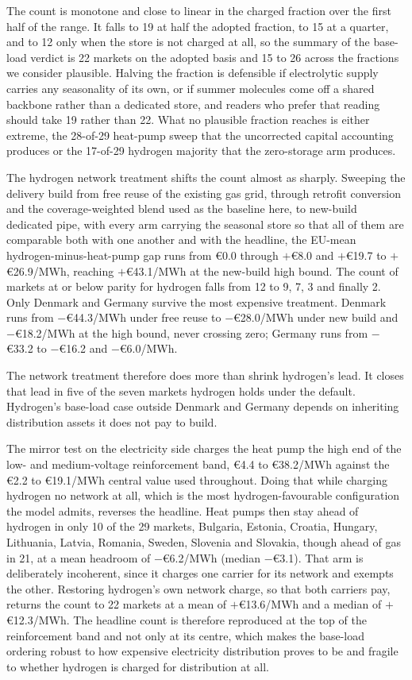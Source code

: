 The count is monotone and close to linear in the charged fraction over the first half
of the range. It falls to 19 at half the adopted fraction, to 15 at a quarter, and to
12 only when the store is not charged at all, so the summary of the base-load
verdict is 22 markets on the adopted basis and 15 to 26 across the fractions we
consider plausible. Halving the fraction is defensible if electrolytic supply carries
any seasonality of its own, or if summer molecules come off a shared backbone rather
than a dedicated store, and readers who prefer that reading should take 19 rather than
22. What no plausible fraction reaches is either extreme, the 28-of-29 heat-pump sweep
that the uncorrected capital accounting produces or the 17-of-29 hydrogen majority that
the zero-storage arm produces.

The hydrogen network treatment shifts the count almost as sharply. Sweeping the
delivery build from free reuse of the existing gas grid, through retrofit conversion
and the coverage-weighted blend used as the baseline here, to new-build dedicated
pipe, with every arm carrying the seasonal store so that all of them are comparable
both with one another and with the headline, the EU-mean hydrogen-minus-heat-pump gap
runs from \euro{}0.0 through $+$\euro{}8.0 and $+$\euro{}19.7 to $+$\euro{}26.9/MWh,
reaching $+$\euro{}43.1/MWh at the new-build high bound. The count of markets at or
below parity for hydrogen falls from 12 to 9, 7, 3 and finally 2. Only Denmark and
Germany survive the most expensive treatment. Denmark runs from $-$\euro{}44.3/MWh
under free reuse to $-$\euro{}28.0/MWh under new build and $-$\euro{}18.2/MWh at the
high bound, never crossing zero; Germany runs from $-$\euro{}33.2 to $-$\euro{}16.2
and $-$\euro{}6.0/MWh.

The network treatment therefore does more than shrink hydrogen's lead. It closes that lead in five of the seven markets hydrogen holds under the default.
Hydrogen's base-load case outside Denmark and Germany depends on inheriting
distribution assets it does not pay to build.

The mirror test on the electricity side charges the heat pump the high end of the
low- and medium-voltage reinforcement band, \euro{}4.4 to \euro{}38.2/MWh against the
\euro{}2.2 to \euro{}19.1/MWh central value used throughout. Doing that while charging
hydrogen no network at all, which is the most hydrogen-favourable configuration the
model admits, reverses the headline. Heat pumps then stay ahead of hydrogen in only 10
of the 29 markets, Bulgaria, Estonia, Croatia, Hungary, Lithuania, Latvia, Romania, Sweden,
Slovenia and Slovakia, though ahead of gas in 21, at a mean headroom of
$-$\euro{}6.2/MWh (median $-$\euro{}3.1). That arm is deliberately incoherent, since it
charges one carrier for its network and exempts the other. Restoring hydrogen's own
network charge, so that both carriers pay, returns the count to 22 markets at a mean of
$+$\euro{}13.6/MWh and a median of $+$\euro{}12.3/MWh. The headline count is therefore
reproduced at the top of the reinforcement band and not only at its centre, which
makes the base-load ordering robust to how expensive electricity distribution proves
to be and fragile to whether hydrogen is charged for distribution at all.


